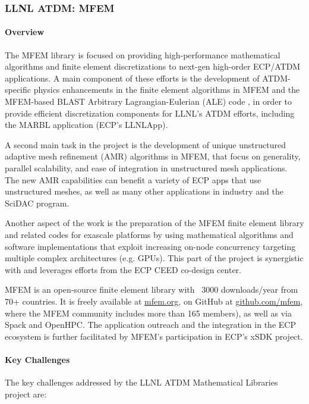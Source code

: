\subsubsection{ LLNL ATDM: MFEM}

\paragraph{Overview}

The MFEM library
\cite{MFEM} is focused on providing high-performance mathematical algorithms
and finite element discretizations to next-gen high-order ECP/ATDM
applications. A main component of these efforts is the development of
ATDM-specific physics enhancements in the finite element algorithms in
MFEM and the MFEM-based BLAST Arbitrary Lagrangian-Eulerian (ALE)
code \cite{BLAST}, in order to provide efficient discretization
components for LLNL's ATDM efforts, including the MARBL application
(ECP's LLNLApp).

A second main task in the project is the development of unique unstructured
adaptive mesh refinement (AMR) algorithms in MFEM, that focus on generality,
parallel scalability, and ease of integration in unstructured mesh
applications. The new AMR capabilities can benefit a variety of ECP apps that
use unstructured meshes, as well as many other applications in industry and the
SciDAC program.

Another aspect of the work is the preparation of the MFEM finite element library
and related codes for exascale platforms by using mathematical algorithms and
software implementations that exploit increasing on-node concurrency targeting
multiple complex architectures (e.g. GPUs). This part of the project is
synergistic with and leverages efforts from the ECP CEED co-design center.

MFEM is an open-source finite element library with ~3000 downloads/year from 70+
countries. It is freely available at \url{mfem.org}, on GitHub
at \url{github.com/mfem}, where the MFEM community includes more than 165
members), as well as via Spack and OpenHPC. The application outreach and the
integration in the ECP ecosystem is further facilitated by MFEM's participation
in ECP's xSDK project.

\paragraph{Key Challenges}

The key challenges addressed by the LLNL ATDM Mathematical Libraries project are:

